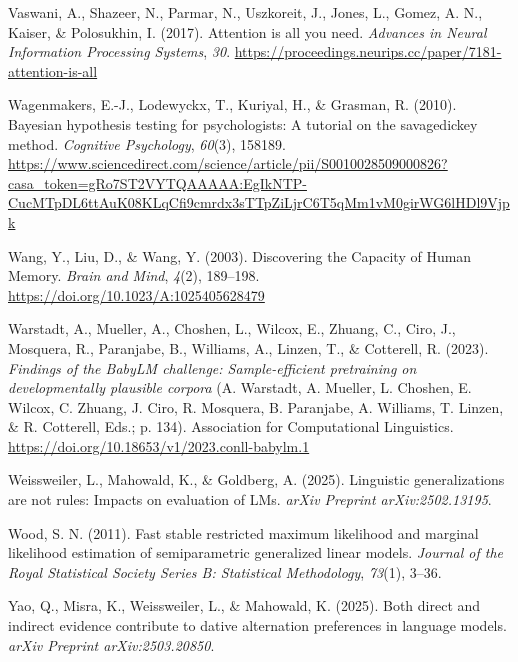 \documentclass[
  12pt,
  letterpaper,
]{scrreprt}
\newlength{\cslhangindent}
\newenvironment{CSLReferences}[2] %
 {\begin{list}{}{%
  \setlength{\itemindent}{0pt}
  \setlength{\leftmargin}{0pt}
  \setlength{\parsep}{0pt}
  \ifodd #1
   \setlength{\leftmargin}{\cslhangindent}
   \setlength{\itemindent}{-1\cslhangindent}
  \fi
  \setlength{\itemsep}{#2\baselineskip}}}
 {\end{list}}
\begin{document}
\begin{CSLReferences}{1}{0}
Vaswani, A., Shazeer, N., Parmar, N., Uszkoreit, J., Jones, L., Gomez,
A. N., Kaiser, \& Polosukhin, I. (2017). Attention is all you need.
\emph{Advances in Neural Information Processing Systems}, \emph{30}.
\url{https://proceedings.neurips.cc/paper/7181-attention-is-all}

Wagenmakers, E.-J., Lodewyckx, T., Kuriyal, H., \& Grasman, R. (2010).
Bayesian hypothesis testing for psychologists: A tutorial on the
savage{\textendash}dickey method. \emph{Cognitive Psychology},
\emph{60}(3), 158189.
\url{https://www.sciencedirect.com/science/article/pii/S0010028509000826?casa_token=gRo7ST2VYTQAAAAA:EgIkNTP-CucMTpDL6ttAuK08KLqCfi9cmrdx3sTTpZiLjrC6T5qMm1vM0girWG6lHDl9Vjpk}

Wang, Y., Liu, D., \& Wang, Y. (2003). Discovering the Capacity of Human
Memory. \emph{Brain and Mind}, \emph{4}(2), 189--198.
\url{https://doi.org/10.1023/A:1025405628479}

Warstadt, A., Mueller, A., Choshen, L., Wilcox, E., Zhuang, C., Ciro,
J., Mosquera, R., Paranjabe, B., Williams, A., Linzen, T., \& Cotterell,
R. (2023). \emph{Findings of the BabyLM challenge: Sample-efficient
pretraining on developmentally plausible corpora} (A. Warstadt, A.
Mueller, L. Choshen, E. Wilcox, C. Zhuang, J. Ciro, R. Mosquera, B.
Paranjabe, A. Williams, T. Linzen, \& R. Cotterell, Eds.; p. 134).
Association for Computational Linguistics.
\url{https://doi.org/10.18653/v1/2023.conll-babylm.1}

Weissweiler, L., Mahowald, K., \& Goldberg, A. (2025). Linguistic
generalizations are not rules: Impacts on evaluation of LMs. \emph{arXiv
Preprint arXiv:2502.13195}.

Wood, S. N. (2011). Fast stable restricted maximum likelihood and
marginal likelihood estimation of semiparametric generalized linear
models. \emph{Journal of the Royal Statistical Society Series B:
Statistical Methodology}, \emph{73}(1), 3--36.

Yao, Q., Misra, K., Weissweiler, L., \& Mahowald, K. (2025). Both direct
and indirect evidence contribute to dative alternation preferences in
language models. \emph{arXiv Preprint arXiv:2503.20850}.


\end{CSLReferences}
\end{document}
